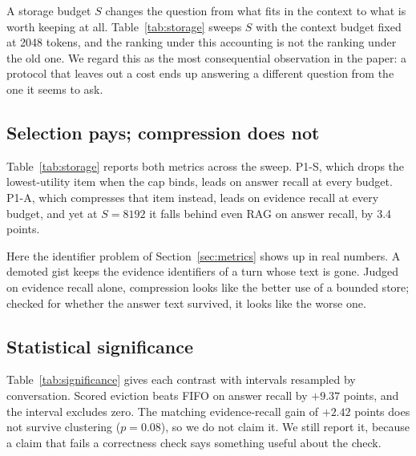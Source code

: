A storage budget $S$ changes the question from what fits in the context to
what is worth keeping at all. Table~\ref{tab:storage} sweeps $S$ with the
context budget fixed at 2048 tokens, and the ranking under this accounting is
not the ranking under the old one. We regard this as the most consequential
observation in the paper: a protocol that leaves out a cost ends up answering
a different question from the one it seems to ask.

\subsection{Selection pays; compression does not}
\label{sec:selection}

Table~\ref{tab:storage} reports both metrics across the sweep. P1-S, which
drops the lowest-utility item when the cap binds, leads on answer recall at
every budget. P1-A, which compresses that item instead, leads on evidence
recall at every budget, and yet at $S=8192$ it falls behind even RAG on answer
recall, by 3.4 points.

Here the identifier problem of Section~\ref{sec:metrics} shows up in real
numbers. A demoted gist keeps the evidence identifiers of a turn whose text is
gone. Judged on evidence recall alone, compression looks like the better use
of a bounded store; checked for whether the answer text survived, it looks
like the worse one.

\begin{table}[t]
\caption{Recall against the storage budget $S$ in tokens, with the context
budget fixed at 2048. $\Delta$ is P1-S minus RAG on answer recall: identical
storage, identical fidelity, identical retrieval, differing only in which turns
are forgotten.}
\label{tab:storage}
\centering
\small

\end{table}

\subsection{Statistical significance}
\label{sec:significance}

Table~\ref{tab:significance} gives each contrast with intervals resampled by
conversation. Scored eviction beats FIFO on answer recall by $+9.37$ points,
and the interval excludes zero. The matching evidence-recall gain of $+2.42$
points does not survive clustering ($p=0.08$), so we do not claim it. We still
report it, because a claim that fails a correctness check says something
useful about the check.

